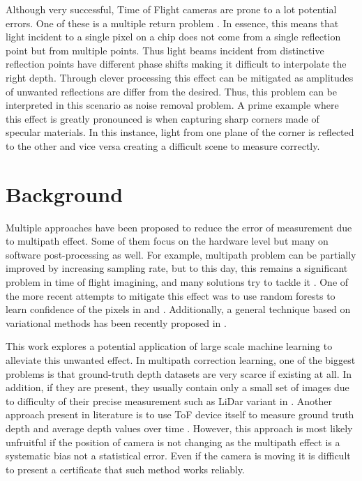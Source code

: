 \documentclass[11pt,twocolumn]{article}
\begin{document}
Although very successful, Time of Flight cameras are prone to a lot potential errors. One of these is a multiple return problem \cite{Grzegorzek2013}. In essence, this means that light incident to a single pixel on a chip does not come from a single reflection point but from multiple points. Thus light beams incident from distinctive reflection points have different phase shifts making it difficult to interpolate the right depth. Through clever processing this effect can be mitigated as amplitudes of unwanted reflections are differ from the desired. Thus, this problem can be interpreted in this scenario as noise removal problem. A prime example where this effect is greatly pronounced is when capturing sharp corners made of specular materials. In this instance, light from one plane of the corner is reflected to the other and vice versa creating a difficult scene to measure correctly.

\section{Background}
Multiple approaches have been proposed to reduce the error of measurement due to multipath effect. Some of them focus on the hardware level but many on software post-processing as well. For example, multipath problem can be partially improved by increasing sampling rate, but to this day, this remains a significant problem in time of flight imagining, and many solutions try to tackle it \cite{Grzegorzek2013,Freedman2014}. One of the more recent attempts to mitigate this effect was to use random forests to learn confidence of the pixels in \cite{Reynolds2011} and  \cite{Song2014}. Additionally, a general technique based on variational methods has been recently proposed in \cite{Freedman2014}. 

This work explores a potential application of large scale machine learning to alleviate this unwanted effect. In multipath correction learning, one of the biggest problems is that ground-truth depth datasets are very scarce if existing at all. In addition, if they are present, they usually contain only a small set of images due to difficulty of their precise measurement such as LiDar variant in \cite{Reynolds2011}. Another approach present in literature is to use ToF device itself to measure ground truth depth and average depth values over time \cite{Song2014}. However, this approach is most likely unfruitful if the position of camera is not changing as the multipath effect is a systematic bias not a statistical error. Even if the camera is moving it is difficult to present a certificate that such method works reliably.  
\end{document}
